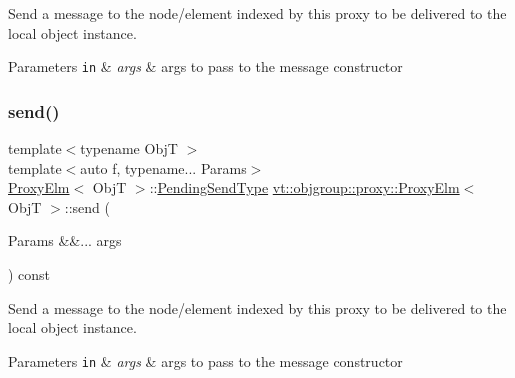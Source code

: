 Send a message to the node/element indexed by this proxy to be delivered to the local object instance. 


\begin{DoxyParams}[1]{Parameters}
\mbox{\tt in}  & {\em args} & args to pass to the message constructor \\
\hline
\end{DoxyParams}
\mbox{\label{structvt_1_1objgroup_1_1proxy_1_1_proxy_elm_a57aa5388399d4e2c186772fc050a3f90}} 
\subsubsection{\texorpdfstring{send()}{send()}\hspace{0.1cm}{\footnotesize\ttfamily [4/4]}}
{\footnotesize\ttfamily template$<$typename ObjT $>$ \\
template$<$auto f, typename... Params$>$ \\
\hyperlink{structvt_1_1objgroup_1_1proxy_1_1_proxy_elm}{Proxy\+Elm}$<$ ObjT $>$\+::\hyperlink{structvt_1_1objgroup_1_1proxy_1_1_proxy_elm_ab0f40d6a0191c974a4f4dd9dec0fc02f}{Pending\+Send\+Type} \hyperlink{structvt_1_1objgroup_1_1proxy_1_1_proxy_elm}{vt\+::objgroup\+::proxy\+::\+Proxy\+Elm}$<$ ObjT $>$\+::send (\begin{DoxyParamCaption}\item[{Params \&\&...}]{args }\end{DoxyParamCaption}) const}



Send a message to the node/element indexed by this proxy to be delivered to the local object instance. 


\begin{DoxyParams}[1]{Parameters}
\mbox{\tt in}  & {\em args} & args to pass to the message constructor \\
\hline
\end{DoxyParams}
\mbox{\label{structvt_1_1objgroup_1_1proxy_1_1_proxy_elm_ad08b5f3df7ea73d8fd11b30225c8f971}} 
